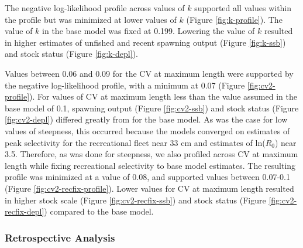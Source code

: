 \documentclass[11pt,
  english,
  letterpaper,
]{article}
\begin{document}
\leavevmode\tagmcend\tagstructend\par


The negative log-likelihood profile across values of {\(k\)\leavevmode\tagmcend\tagstructend} supported all values within the profile but was minimized at lower values of {\(k\)\leavevmode\tagmcend\tagstructend} (Figure \ref{fig:k-profile}). The value of {\(k\)\leavevmode\tagmcend\tagstructend} in the base model was fixed at 0.199. Lowering the value of {\(k\)\leavevmode\tagmcend\tagstructend} resulted in higher estimates of unfished and recent spawning output (Figure \ref{fig:k-ssb}) and stock status (Figure \ref{fig:k-depl}).

\leavevmode\tagmcend\tagstructend\par


Values between 0.06 and 0.09 for the CV at maximum length were supported by the negative log-likelihood profile, with a minimum at 0.07 (Figure \ref{fig:cv2-profile}). For values of CV at maximum length less than the value assumed in the base model of 0.1, spawning output (Figure \ref{fig:cv2-ssb}) and stock status (Figure \ref{fig:cv2-depl}) differed greatly from for the base model. As was the case for low values of steepness, this occurred because the models converged on estimates of peak selectivity for the recreational fleet near 33 cm and estimates of ln({\(R_0\)\leavevmode\tagmcend\tagstructend}) near 3.5. Therefore, as was done for steepness, we also profiled across CV at maximum length while fixing recreational selectivity to base model estimates. The resulting profile was minimized at a value of 0.08, and supported values between 0.07-0.1 (Figure \ref{fig:cv2-recfix-profile}). Lower values for CV at maximum length resulted in higher stock scale (Figure \ref{fig:cv2-recfix-ssb}) and stock status (Figure \ref{fig:cv2-recfix-depl}) compared to the base model.

\leavevmode\tagmcend\tagstructend\par


\hypertarget{retrospective-analysis}{%
\subsubsection{Retrospective Analysis}\label{retrospective-analysis}}
\end{document}
